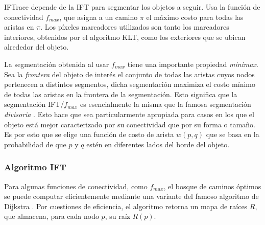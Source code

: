 \documentclass[a4paper,10pt]{article}
\begin{document}
IFTrace depende de la IFT
para segmentar los objetos a seguir. Usa la función de conectividad $f_{max}$, que
asigna a un camino $\pi$ el máximo costo para todas las aristas en $\pi$.
Los píxeles marcadores utilizados son tanto los marcadores interiores, obtenidos
por el algoritmo KLT, como los exteriores que se ubican alrededor del objeto.

La segmentación obtenida al usar $f_{max}$ tiene una importante propiedad
\textit{minimax}. Sea la \textit{frontera} del objeto de interés el conjunto de todas las aristas cuyos nodos
pertenecen a distintos segmentos, dicha segmentación maximiza el costo mínimo de todas las aristas en la frontera de la
segmentación. Esto significa que la segmentación IFT/$f_{max}$ es esencialmente
la misma que la famosa segmentación \textit{divisoria} \cite{watershed-segmentation}. Esto
hace que sea particularmente apropiada para casos en los que el objeto está
mejor caracterizado por su conectividad que por su forma o tamaño. Es por esto que
se elige una función de costo de arista $w(p,q)$ que se basa en la probabilidad de
que $p$ y $q$ estén en diferentes lados del borde del objeto.

\subsubsection{Algoritmo IFT}

Para algunas funciones de conectividad, como $f_{max}$, el bosque de caminos
óptimos se puede computar eficientemente mediante una variante del famoso
algoritmo de Dijkstra \cite{watershed-segmentation}. Por cuestiones de
eficiencia, el algoritmo retorna un mapa de raíces $R$, que almacena, para
cada nodo $p$, su raíz $R(p)$.\\
\end{document}
